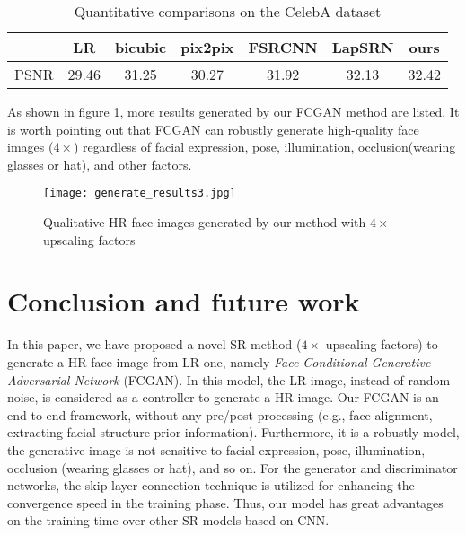 \documentclass[conference,compsoc]{IEEEtran}
\begin{document}
\begin{table}
  \caption{Quantitative comparisons on the CelebA dataset}
    \label{tab:PSNR}
  \begin{tabular}{ccccccc}
    \toprule
    & LR & bicubic & pix2pix & FSRCNN & LapSRN & ours \\
    \midrule
  PSNR & 29.46 & 31.25 & 30.27 & 31.92 & 32.13 & 32.42 \\
    \bottomrule
\end{tabular}
\end{table}


As shown in figure \ref{Fig:gene_results}, more results generated by our FCGAN method are listed. It is worth pointing out that FCGAN can robustly generate high-quality face images ($4 \times$) regardless of facial expression, pose, illumination, occlusion(wearing glasses or hat), and other factors.

\begin{figure}[h]
  \centering
  \texttt{[image: generate\_results3.jpg]}
  \caption{Qualitative HR face images generated by our method with $4\times$ upscaling factors}
  \label{Fig:gene_results}
\end{figure}













\section{Conclusion and future work}
In this paper, we have proposed a novel SR method ($4\times$ upscaling factors) to generate a HR face image from LR one, namely \textit{Face Conditional Generative Adversarial Network} (FCGAN). In this model, the LR image, instead of random noise, is considered as a controller to generate a HR image. Our FCGAN is an end-to-end framework, without any pre/post-processing (e.g., face alignment, extracting facial structure prior information). Furthermore, it is a robustly model, the generative image is not sensitive to facial expression, pose, illumination, occlusion (wearing glasses or hat), and so on. For the generator and discriminator networks, the skip-layer connection technique is utilized for enhancing the convergence speed in the training phase. Thus, our model has great advantages on the training time over other SR models based on CNN.
\end{document}
